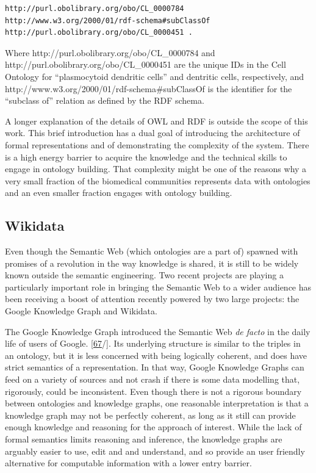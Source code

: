 \begin{verbatim}
http://purl.obolibrary.org/obo/CL_0000784  http://www.w3.org/2000/01/rdf-schema#subClassOf  http://purl.obolibrary.org/obo/CL_0000451 .
\end{verbatim}

Where http://purl.obolibrary.org/obo/CL\_0000784 and http://purl.obolibrary.org/obo/CL\_0000451 are the unique IDs in the Cell Ontology for ``plasmocytoid dendritic cells'' and dentritic cells, respectively, and http://www.w3.org/2000/01/rdf-schema\#subClassOf is the identifier for the ``subclass of'' relation as defined by the RDF schema.

A longer explanation of the details of OWL and RDF is outside the scope of this work.
This brief introduction has a dual goal of introducing the architecture of formal representations and of demonstrating the complexity of the system.
There is a high energy barrier to acquire the knowledge and the technical skills to engage in ontology building.
That complexity might be one of the reasons why a very small fraction of the biomedical communities represents data with ontologies and an even smaller fraction engages with ontology building.

\hypertarget{wikidata}{%
\subsection{Wikidata}\label{wikidata}}

Even though the Semantic Web (which ontologies are a part of) spawned with promises of a revolution in the way knowledge is shared, it is still to be widely known outside the semantic engineering. Two recent projects are playing a particularly important role in bringing the Semantic Web to a wider audience has been receiving a boost of attention recently powered by two large projects: the Google Knowledge Graph and Wikidata.

The Google Knowledge Graph introduced the Semantic Web \emph{de facto} in the daily life of users of Google. {[}\protect\hyperlink{ref-16mCkZC1r}{67}/{]}. Its underlying structure is similar to the triples in an ontology, but it is less concerned with being logically coherent, and does have strict semantics of a representation.
In that way, Google Knowledge Graphs can feed on a variety of sources and not crash if there is some data modelling that, rigorously, could be inconsistent.
Even though there is not a rigorous boundary between ontologies and knowledge graphs, one reasonable interpretation is that a knowledge graph may not be perfectly coherent, as long as it still can provide enough knowledge and reasoning for the approach of interest.
While the lack of formal semantics limits reasoning and inference, the knowledge graphs are arguably easier to use, edit and and understand, and so provide an user friendly alternative for computable information with a lower entry barrier.

